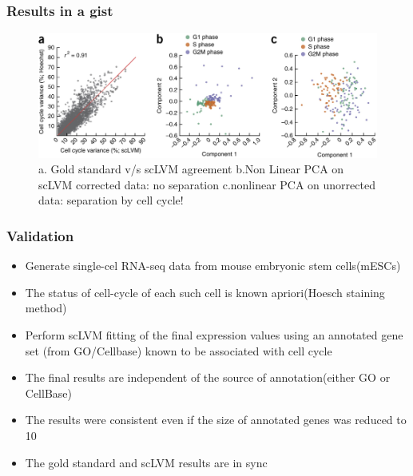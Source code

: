 \documentclass[10pt, compress]{beamer}
\renewcommand{\(}{\begin{columns}}
\renewcommand{\)}{\end{columns}}
\newcommand{\<}[1]{\begin{column}{#1}}
\renewcommand{\>}{\end{column}}
\begin{document}
\begin{frame}
\frametitle{Results in a gist}
\begin{figure}
\includegraphics[width=0.8\linewidth]{images/results1.jpg}
\caption{a. Gold standard v/s scLVM agreement
b.Non Linear PCA on scLVM corrected data: no separation c.nonlinear PCA on unorrected data: separation by cell cycle!}
\end{figure}
\end{frame}


\begin{frame}
\frametitle{Validation}
\begin{itemize}[<+- | alert@+>]
\item Generate single-cel RNA-seq data from mouse embryonic stem cells(mESCs)
\item The status of cell-cycle of each such cell is known apriori(Hoesch staining method)
\item Perform scLVM fitting of the final expression values using an annotated gene set (from GO/Cellbase) known to be associated
with cell cycle
\item The final results are independent of the source of annotation(either GO or CellBase)
\item The results were consistent even if the size of annotated genes was reduced to 10
\item The gold standard and scLVM results are in sync
\end{itemize}
\end{frame}
\end{document}
